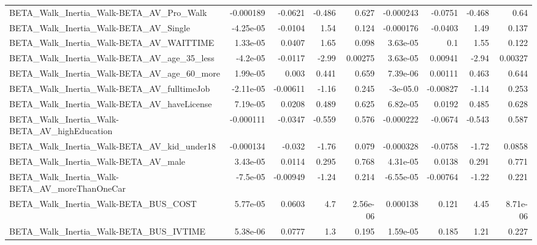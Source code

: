 \begin{tabular}{lrrrrrrrr}
BETA\_Walk\_Inertia\_Walk-BETA\_AV\_Pro\_Walk            &   -0.000189 &      -0.0621 &   -0.486 &    0.627 &  -0.000243 &     -0.0751 &       -0.468 &          0.64 \\
BETA\_Walk\_Inertia\_Walk-BETA\_AV\_Single              &   -4.25e-05 &      -0.0104 &     1.54 &    0.124 &  -0.000176 &     -0.0403 &         1.49 &         0.137 \\
BETA\_Walk\_Inertia\_Walk-BETA\_AV\_WAITTIME            &    1.33e-05 &       0.0407 &     1.65 &    0.098 &   3.63e-05 &         0.1 &         1.55 &         0.122 \\
BETA\_Walk\_Inertia\_Walk-BETA\_AV\_age\_35\_less         &    -4.2e-05 &      -0.0117 &    -2.99 &  0.00275 &   3.63e-05 &     0.00941 &        -2.94 &       0.00327 \\
BETA\_Walk\_Inertia\_Walk-BETA\_AV\_age\_60\_more         &    1.99e-05 &        0.003 &    0.441 &    0.659 &   7.39e-06 &     0.00111 &        0.463 &         0.644 \\
BETA\_Walk\_Inertia\_Walk-BETA\_AV\_fulltimeJob         &   -2.11e-05 &     -0.00611 &    -1.16 &    0.245 &   -3e-05.0 &    -0.00827 &        -1.14 &         0.253 \\
BETA\_Walk\_Inertia\_Walk-BETA\_AV\_haveLicense         &    7.19e-05 &       0.0208 &    0.489 &    0.625 &   6.82e-05 &      0.0192 &        0.485 &         0.628 \\
BETA\_Walk\_Inertia\_Walk-BETA\_AV\_highEducation       &   -0.000111 &      -0.0347 &   -0.559 &    0.576 &  -0.000222 &     -0.0674 &       -0.543 &         0.587 \\
BETA\_Walk\_Inertia\_Walk-BETA\_AV\_kid\_under18         &   -0.000134 &       -0.032 &    -1.76 &    0.079 &  -0.000328 &     -0.0758 &        -1.72 &        0.0858 \\
BETA\_Walk\_Inertia\_Walk-BETA\_AV\_male                &    3.43e-05 &       0.0114 &    0.295 &    0.768 &   4.31e-05 &      0.0138 &        0.291 &         0.771 \\
BETA\_Walk\_Inertia\_Walk-BETA\_AV\_moreThanOneCar      &    -7.5e-05 &     -0.00949 &    -1.24 &    0.214 &  -6.55e-05 &    -0.00764 &        -1.22 &         0.221 \\
BETA\_Walk\_Inertia\_Walk-BETA\_BUS\_COST               &    5.77e-05 &       0.0603 &      4.7 & 2.56e-06 &   0.000138 &       0.121 &         4.45 &      8.71e-06 \\
BETA\_Walk\_Inertia\_Walk-BETA\_BUS\_IVTIME             &    5.38e-06 &       0.0777 &      1.3 &    0.195 &   1.59e-05 &       0.185 &         1.21 &         0.227 \\

\end{tabular}
